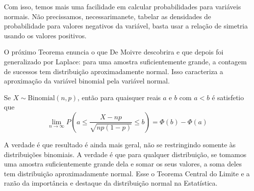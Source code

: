 Com isso, temos mais uma facilidade em calcular probabilidades para variáveis normais.
Não precissamos, necessarimanete, tabelar as densidades de probabilidade para valores
negativos da variável, basta usar a relação de simetria usando os valores positivos.

O próximo Teorema enuncia o que De Moivre descobrira e que depois foi generalizado por
Laplace: para uma amostra suficientemente grande, a contagem de sucessos tem distribuição
aproximadamente normal.
Isso caracteriza a aproximação da variável binomial pela variável normal.

\begin{thm:demoivre-laplace}
Se $X \sim \mathrm{Binomial}(n, p)$, então para quaisquer reais $a$ e $b$ com $a < b$ é
satisfetio que
\[
    \lim_{n \to \infty} P\left(a \le \frac{X - np}{\sqrt{np(1-p)}} \le b\right) = \Phi(b) - \Phi(a)
\]
\end{thm:demoivre-laplace}

A verdade é que resultado é ainda mais geral, não se restringindo somente às distribuições
binomiais. A verdade é que para qualquer distribuição, se tomamos uma amostra suficientemente
grande dela e somar os seus valores, a soma deles tem distribuição aproximadamente normal.
Esse o Teorema Central do Limite e a razão da importância e destaque da distribuição
normal na Estatística.
